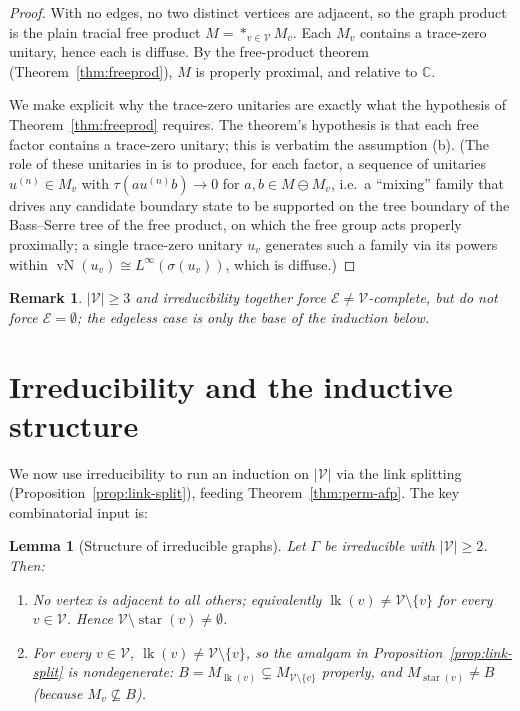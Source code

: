 \documentclass[11pt]{article}
\newtheorem{lemma}{Lemma}
\newtheorem{remark}{Remark}
\DeclareMathOperator{\vN}{vN}
\DeclareMathOperator{\link}{lk}
\DeclareMathOperator{\str}{star}
\newcommand{\Gra}{\Gamma}
\newcommand{\VV}{\mathcal V}
\newcommand{\EE}{\mathcal E}
\newcommand{\abs}[1]{\lvert #1\rvert}
\newcommand{\set}[1]{\{#1\}}
\begin{document}
\begin{proof}
With no edges, no two distinct vertices are adjacent, so the graph product is the plain tracial free product
$M=\ast_{v\in\VV}M_v$. Each $M_v$ contains a trace-zero unitary, hence each is diffuse. By the free-product
theorem (Theorem~\ref{thm:freeprod}), $M$ is properly proximal, and relative to $\mathbb C$.

We make explicit why the trace-zero unitaries are exactly what the hypothesis of
Theorem~\ref{thm:freeprod} requires. The theorem's hypothesis is that each free factor contains a
trace-zero unitary; this is verbatim the assumption (b). (The role of these unitaries in
\cite{DEP,BIP} is to produce, for each factor, a sequence of unitaries $u^{(n)}\in M_v$ with
$\tau(a u^{(n)} b)\to 0$ for $a,b\in M\ominus M_v$, i.e.\ a ``mixing'' family that drives any candidate
boundary state to be supported on the tree boundary of the Bass--Serre tree of the free product, on which
the free group acts properly proximally; a single trace-zero unitary $u_v$ generates such a family via its
powers within $\vN(u_v)\cong L^\infty(\sigma(u_v))$, which is diffuse.)
\end{proof}

\begin{remark}
$\abs{\VV}\ge3$ and irreducibility together force $\EE\ne\VV$-complete, but do \emph{not} force
$\EE=\emptyset$; the edgeless case is only the base of the induction below.
\end{remark}

\section{Irreducibility and the inductive structure}\label{sec:irred}

We now use irreducibility to run an induction on $\abs{\VV}$ via the link splitting
(Proposition~\ref{prop:link-split}), feeding Theorem~\ref{thm:perm-afp}. The key combinatorial input is:

\begin{lemma}[Structure of irreducible graphs]\label{lem:irred-structure}
Let $\Gra$ be irreducible with $\abs{\VV}\ge 2$. Then:
\begin{enumerate}
\item[(i)] No vertex is adjacent to all others; equivalently $\link(v)\ne\VV\setminus\set v$ for every
$v\in\VV$. Hence $\VV\setminus\str(v)\ne\emptyset$.
\item[(ii)] For every $v\in\VV$, $\link(v)\ne\VV\setminus\set v$, so the amalgam in
Proposition~\ref{prop:link-split} is nondegenerate: $B=M_{\link(v)}\subsetneq M_{\VV\setminus\set v}$ properly,
and $M_{\str(v)}\ne B$ (because $M_v\not\subseteq B$).
\end{enumerate}
\end{lemma}
\end{document}
